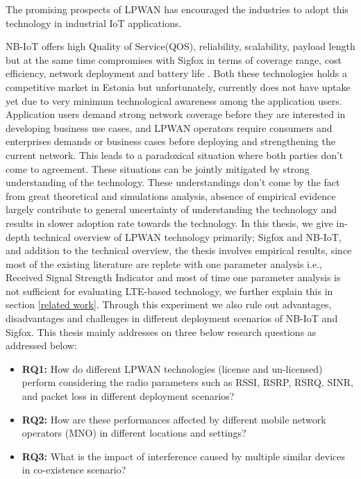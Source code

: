 \documentclass[12pt]{article}
\begin{document}
The promising prospects of LPWAN has encouraged the industries to adopt this technology in industrial IoT applications. \par
NB-IoT offers high Quality of Service(QOS), reliability, scalability, payload length but at the same time compromises with Sigfox in terms of coverage range, cost efficiency, network deployment and battery life \cite{mekki2019comparative}. Both these technologies holds a competitive market in Estonia but unfortunately, currently does not have uptake yet due to very minimum technological awareness among the application users. Application users demand strong network coverage before they are interested in developing business use cases, and LPWAN operators require consumers and enterprises demands or business cases before deploying and strengthening the current network. This leads to a paradoxical situation where both parties don't come to agreement. These situations can be jointly mitigated by strong understanding of the technology. These understandings don't come by the fact from great theoretical and simulations analysis, absence of empirical evidence largely contribute to general uncertainty of understanding the technology and results in slower adoption rate towards the technology. In this thesis, we give in-depth technical overview of LPWAN technology primarily; Sigfox and NB-IoT, and addition to the technical overview, the thesis involves empirical results, since most of the existing literature are replete with one parameter analysis i.e., Received Signal Strength Indicator \cite{malik2019nb,khan2019dorm} and most of time one parameter analysis is not sufficient for evaluating LTE-based technology, we further explain this in section \ref{related work}. Through this experiment we also rule out advantages, disadvantages and challenges in different deployment scenarios of NB-IoT and Sigfox. This thesis mainly addresses on three below research questions as addressed below:
\begin{itemize}
   \item \textbf{RQ1:} How do different LPWAN technologies (license and un-licensed) perform considering the radio parameters such as RSSI, RSRP, RSRQ, SINR, and packet loss in different deployment scenarios?
\item \textbf{RQ2:} How are these performances affected by different mobile network operators (MNO) in different locations and settings?

\item \textbf{RQ3:} What is the impact of interference caused by multiple similar devices in co-existence scenario? 
   \end{itemize}
\end{document}
